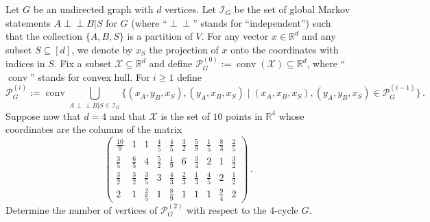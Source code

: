 Let $G$ be an undirected graph with $d$ vertices. Let $\mathcal{I}_G$ be the set of global Markov statements $A\!\perp\!\!\!\!\perp\! B|S$ for $G$ (where ``$\perp\!\!\!\!\perp$'' stands for ``independent'') such that the collection $\{A,B,S\}$ is a partition of $V$.
For any vector $x\in\mathbb{R}^d$ and any subset $S\subseteq[d]$, we denote by $x_S$ the projection of $x$ onto the coordinates with indices in $S$. Fix a subset $\mathcal{X}\subseteq\mathbb{R}^d$ and define $\mathcal{P}^{(0)}_{G}:=\operatorname{conv}(\mathcal{X})\subseteq\mathbb{R}^d$, where ``$\operatorname{conv}$'' stands for convex hull. For $i\ge 1$ define
\[
    \mathcal{P}^{(i)}_{G} := \operatorname{conv}\bigcup_{A\perp\!\!\!\!\perp B|S\in\mathcal{I}_G}\{(x_A,y_B,x_S),(y_A,x_B,x_S)\mid(x_A,x_B,x_S),(y_A,y_B,x_S)\in\mathcal{P}^{(i-1)}_{G}\}\,.
\]
Suppose now that $d=4$ and that $\mathcal{X}$ is the set of $10$ points in $\mathbb{R}^4$ whose coordinates are the columns of the matrix
\[
    \left(\!\begin{array}{cccccccccc}
      \frac{10}{9}&1&1&\frac{4}{5}&\frac{4}{5}&\frac{3}{2}&\frac{5}{9}&\frac{1}{5}&\frac{8}{3}&\frac{2}{5}\\[7pt]
      \frac{3}{5}&\frac{6}{5}&4&\frac{5}{2}&\frac{1}{9}&6&\frac{3}{4}&2&1&\frac{3}{2}\\[7pt]
      \frac{3}{2}&\frac{3}{2}&\frac{3}{5}&3&\frac{4}{3}&\frac{2}{3}&\frac{1}{3}&\frac{4}{5}&2&\frac{1}{2}\\[7pt]
      2&1&\frac{2}{5}&1&\frac{8}{9}&1&1&1&\frac{9}{4}&2
      \end{array}\!\right)\,.
\]
Determine the number of vertices of $\mathcal{P}^{(2)}_{G}$ with respect to the $4$-cycle $G$.
